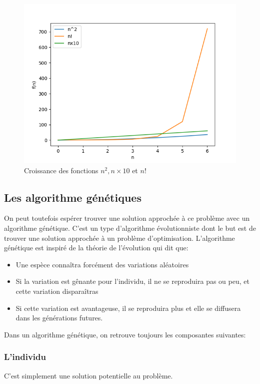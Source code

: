 \documentclass[12pt]{article}
\begin{document}
\begin{figure}[H]
\centering
\includegraphics[width=.9\linewidth]{./complexite.png}
\caption{Croissance des fonctions $n^2, n \times 10$ et $n!$}
\end{figure}

\subsection{Les algorithme génétiques}
\label{sec-1-2}

On peut toutefois espérer trouver une solution approchée à ce problème avec un algorithme génétique.
C'est un type d'algorithme évolutionniste dont le but est de trouver une solution approchée à un problème d'optimisation.
L'algorithme génétique est inspiré de la théorie de l'évolution qui dit que:
\begin{itemize}
\item Une espèce connaîtra forcément des variations aléatoires
\item Si la variation est gênante pour l'individu, il ne se reproduira pas ou peu, et cette variation disparaîtras
\item Si cette variation est avantageuse, il se reproduira plus et elle se diffusera dans les générations futures.
\end{itemize}

Dans un algorithme génétique, on retrouve toujours les composantes suivantes:

\subsubsection*{L'individu}

C'est simplement une solution potentielle au problème.
\end{document}
